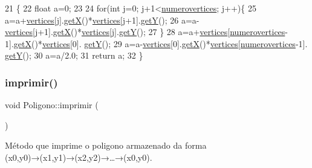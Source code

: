 \begin{DoxyCode}
21 \{
22     \textcolor{keywordtype}{float} a=0;
23 
24     \textcolor{keywordflow}{for}(\textcolor{keywordtype}{int} j=0; j+1<\mbox{\hyperlink{class_poligono_adc59c72d363089aa8dc097e1f338875a}{numerovertices}}; j++)\{
25     a=a+\mbox{\hyperlink{class_poligono_a18179d267bdf366f6bb00a4e1b16f1d7}{vertices}}[j].\mbox{\hyperlink{class_point_acc27466778cc87a662bba40268c4c0c8}{getX}}()*\mbox{\hyperlink{class_poligono_a18179d267bdf366f6bb00a4e1b16f1d7}{vertices}}[j+1].\mbox{\hyperlink{class_point_a3cccbca94719ddde353cce86ce0e2f64}{getY}}();
26     a=a-\mbox{\hyperlink{class_poligono_a18179d267bdf366f6bb00a4e1b16f1d7}{vertices}}[j+1].\mbox{\hyperlink{class_point_acc27466778cc87a662bba40268c4c0c8}{getX}}()*\mbox{\hyperlink{class_poligono_a18179d267bdf366f6bb00a4e1b16f1d7}{vertices}}[j].\mbox{\hyperlink{class_point_a3cccbca94719ddde353cce86ce0e2f64}{getY}}();
27     \}
28     a=a+\mbox{\hyperlink{class_poligono_a18179d267bdf366f6bb00a4e1b16f1d7}{vertices}}[\mbox{\hyperlink{class_poligono_adc59c72d363089aa8dc097e1f338875a}{numerovertices}}-1].\mbox{\hyperlink{class_point_acc27466778cc87a662bba40268c4c0c8}{getX}}()*\mbox{\hyperlink{class_poligono_a18179d267bdf366f6bb00a4e1b16f1d7}{vertices}}[0].
      \mbox{\hyperlink{class_point_a3cccbca94719ddde353cce86ce0e2f64}{getY}}();
29     a=a-\mbox{\hyperlink{class_poligono_a18179d267bdf366f6bb00a4e1b16f1d7}{vertices}}[0].\mbox{\hyperlink{class_point_acc27466778cc87a662bba40268c4c0c8}{getX}}()*\mbox{\hyperlink{class_poligono_a18179d267bdf366f6bb00a4e1b16f1d7}{vertices}}[\mbox{\hyperlink{class_poligono_adc59c72d363089aa8dc097e1f338875a}{numerovertices}}-1].
      \mbox{\hyperlink{class_point_a3cccbca94719ddde353cce86ce0e2f64}{getY}}();
30     a=a/2.0;
31     \textcolor{keywordflow}{return} a;
32 \}
\end{DoxyCode}
\mbox{\label{class_poligono_a754dee9ed6a8fee4eb1a9d0aa0e1707a}} 
\subsubsection{\texorpdfstring{imprimir()}{imprimir()}}
{\footnotesize\ttfamily void Poligono\+::imprimir (\begin{DoxyParamCaption}{ }\end{DoxyParamCaption})}



Método que imprime o poligono armazenado da forma (x0,y0)→(x1,y1)→(x2,y2)→…​→(x0,y0). 


